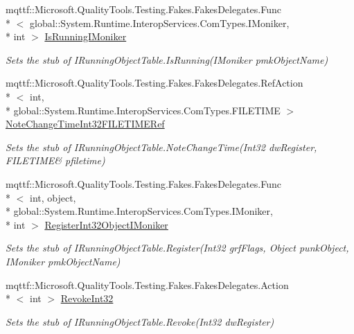 \begin{DoxyCompactItemize}
mqttf\-::\-Microsoft.\-Quality\-Tools.\-Testing.\-Fakes.\-Fakes\-Delegates.\-Func\\*
$<$ global\-::\-System.\-Runtime.\-Interop\-Services.\-Com\-Types.\-I\-Moniker, \\*
int $>$ \hyperlink{class_system_1_1_runtime_1_1_interop_services_1_1_com_types_1_1_fakes_1_1_stub_i_running_object_table_a014769be28fb3c77e5d374ae4647245b}{Is\-Running\-I\-Moniker}
\begin{DoxyCompactList}\small\item\em Sets the stub of I\-Running\-Object\-Table.\-Is\-Running(\-I\-Moniker pmk\-Object\-Name)\end{DoxyCompactList}\item 
mqttf\-::\-Microsoft.\-Quality\-Tools.\-Testing.\-Fakes.\-Fakes\-Delegates.\-Ref\-Action\\*
$<$ int, \\*
global\-::\-System.\-Runtime.\-Interop\-Services.\-Com\-Types.\-F\-I\-L\-E\-T\-I\-M\-E $>$ \hyperlink{class_system_1_1_runtime_1_1_interop_services_1_1_com_types_1_1_fakes_1_1_stub_i_running_object_table_a90d1151246b7e24f1f38ab36471e0895}{Note\-Change\-Time\-Int32\-F\-I\-L\-E\-T\-I\-M\-E\-Ref}
\begin{DoxyCompactList}\small\item\em Sets the stub of I\-Running\-Object\-Table.\-Note\-Change\-Time(Int32 dw\-Register, F\-I\-L\-E\-T\-I\-M\-E\& pfiletime)\end{DoxyCompactList}\item 
mqttf\-::\-Microsoft.\-Quality\-Tools.\-Testing.\-Fakes.\-Fakes\-Delegates.\-Func\\*
$<$ int, object, \\*
global\-::\-System.\-Runtime.\-Interop\-Services.\-Com\-Types.\-I\-Moniker, \\*
int $>$ \hyperlink{class_system_1_1_runtime_1_1_interop_services_1_1_com_types_1_1_fakes_1_1_stub_i_running_object_table_a579d8b96c5f1e11d347fdc68741338ff}{Register\-Int32\-Object\-I\-Moniker}
\begin{DoxyCompactList}\small\item\em Sets the stub of I\-Running\-Object\-Table.\-Register(\-Int32 grf\-Flags, Object punk\-Object, I\-Moniker pmk\-Object\-Name)\end{DoxyCompactList}\item 
mqttf\-::\-Microsoft.\-Quality\-Tools.\-Testing.\-Fakes.\-Fakes\-Delegates.\-Action\\*
$<$ int $>$ \hyperlink{class_system_1_1_runtime_1_1_interop_services_1_1_com_types_1_1_fakes_1_1_stub_i_running_object_table_a28b975aa79efb4ed127ad2b119cc44a1}{Revoke\-Int32}
\begin{DoxyCompactList}\small\item\em Sets the stub of I\-Running\-Object\-Table.\-Revoke(\-Int32 dw\-Register)\end{DoxyCompactList}\end{DoxyCompactItemize}


